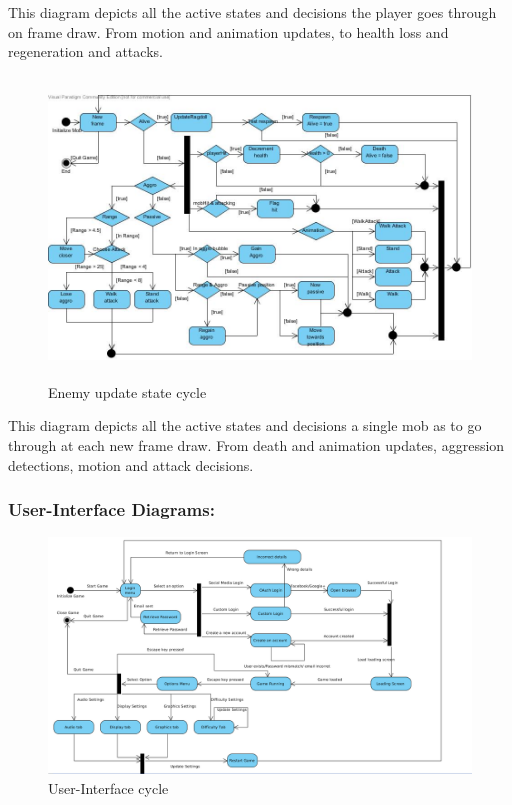 \documentclass[letterpaper]{article}
\begin{document}
					This diagram depicts all the active states and decisions the player goes through on frame draw. From motion and animation updates, to health loss and regeneration and attacks.
					
					\begin{figure}[H]
					\centering
					\includegraphics[width=180mm, height=80mm]{UML_Diagram/State/Mob_State.jpg}
					\caption{Enemy update state cycle}
					\label{overflow}
					\end{figure}
					
					This diagram depicts all the active states and decisions a single mob as to go through at each new frame draw. From death and animation updates, aggression detections, motion and attack decisions.
			
				\subsubsection*{User-Interface Diagrams:}
				\vspace{0.1in}
					
					\begin{figure}[H]
					\centering
					\includegraphics[width=180mm]{UML_Diagram/State/GUI_State.jpg}
					\caption{User-Interface cycle}
					\label{overflow}
					\end{figure}
				
\end{document}
